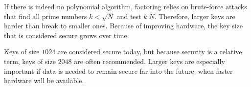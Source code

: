 If there is indeed no polynomial algorithm, factoring relies on brute-force attacks that find all prime numbers $k<\sqrt{N}$ and test $k|N$.
Therefore, larger keys are harder than break to smaller ones.
Because of improving hardware, the key size that is considered secure grows over time.

Keys of size $1024$ are considered secure today, but because security is a relative term, keys of size $2048$ are often recommended. 
Larger keys are especially important if data is needed to remain secure far into the future, when faster hardware will be available.
